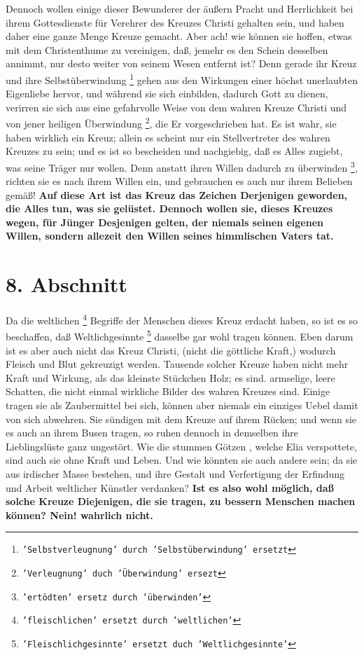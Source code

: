  Dennoch wollen einige dieser Bewunderer der äußern
Pracht und Herrlichkeit bei
ihrem Gottesdienste für Verehrer des Kreuzes Christi gehalten sein, und haben
daher eine ganze Menge Kreuze gemacht. Aber ach! wie können sie hoffen, etwas
mit dem Christenthume zu vereinigen, daß, jemehr es den Schein desselben
annimmt, nur desto weiter von seinem Wesen entfernt ist? Denn gerade ihr Kreuz
und ihre Selbstüberwindung \footnote{\texttt{'Selbstverleugnung' durch 'Selbstüberwindung' ersetzt}}
gehen aus den Wirkungen einer höchst unerlaubten
Eigenliebe hervor, und während sie sich einbilden, dadurch
Gott zu dienen,
verirren sie sich aus eine gefahrvolle Weise von dem wahren Kreuze Christi und
von jener heiligen Überwindung \footnote{\texttt{'Verleugnung' duch 'Überwindung'
ersezt}}, die Er vorgeschrieben hat. Es ist wahr, sie
haben wirklich ein Kreuz; allein es scheint nur ein Stellvertreter des wahren
Kreuzes zu sein; und es ist so bescheiden und
nachgiebig, daß es Alles zugiebt,
was seine Träger nur wollen. Denn anstatt ihren Willen dadurch zu überwinden
\footnote{\texttt{'ertödten' ersetz durch 'überwinden'}},
richten sie es nach ihrem Willen ein, und gebrauchen es auch nur ihrem Belieben
gemäß! \textbf{Auf diese Art ist das Kreuz das Zeichen Derjenigen geworden, die
Alles
tun,  was sie gelüstet. Dennoch wollen sie, dieses Kreuzes wegen, für Jünger
Desjenigen gelten, der niemals seinen eigenen Willen, sondern allezeit den
Willen seines himmlischen Vaters tat.}

\section{8. Abschnitt} \label{kap5_ab8}

 Da die weltlichen \footnote{\texttt{'fleischlichen' ersetzt
durch 'weltlichen'}} Begriffe der Menschen dieses Kreuz erdacht haben, so ist
es
so beschaffen, daß Weltlichgesinnte \footnote{\texttt{'Fleischlichgesinnte' ersetzt
duch 'Weltlichgesinnte'}} dasselbe gar wohl tragen können. Eben
darum ist es aber auch nicht das Kreuz Christi, (nicht die göttliche Kraft,)
wodurch Fleisch und Blut gekreuzigt werden. Tausende solcher Kreuze haben nicht
mehr Kraft und Wirkung, als das kleinste Stückchen Holz; es sind. armselige,
leere Schatten, die nicht einmal wirkliche Bilder des wahren Kreuzes sind.
Einige tragen sie als Zaubermittel bei sich, können aber niemals ein einziges
Uebel damit von sich abwehren. Sie sündigen mit dem Kreuze auf ihrem Rücken; und
wenn sie es auch an ihrem Busen tragen, so ruhen dennoch in demselben ihre
Lieblingslüste ganz ungestört. Wie die stummen Götzen , welche Elia  verspottete,
sind auch sie ohne Kraft und Leben. Und wie könnten sie auch andere sein; da sie
aus irdischer Masse bestehen, und ihre Gestalt und Verfertigung der Erfindung
und Arbeit weltlicher Künstler verdanken? \textbf{Ist es also wohl möglich, daß
solche
Kreuze Diejenigen, die sie tragen, zu bessern Menschen machen können? Nein!
wahrlich nicht.}

